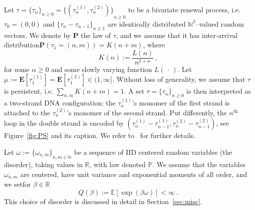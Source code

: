 \documentclass[11pt]{article}
\theoremstyle{definition}
\numberwithin{equation}{section}
\numberwithin{figure}{section}
\numberwithin{table}{section}
\DeclareMathOperator{\tHt}{th}
\newcommand{\ga}{\alpha}
\newcommand{\bP}{\ensuremath{\mathbf{P}}}
\newcommand{\bE}{\ensuremath{\mathbf{E}}}
\newcommand{\bbE}{\ensuremath{\mathbb{E}}}
\newcommand{\bbN}{\ensuremath{\mathbb{N}}}
\newcommand{\bbP}{\ensuremath{\mathbb{P}}}
\newcommand{\bbR}{\ensuremath{\mathbb{R}}}
\begin{document}
Let $\tau = {\lbrace \tau_n \rbrace}_{n\geq 0}= {\lbrace (\tau_n^{(1)}, \tau_n^{(2)}) \rbrace}_{n\geq 0}$ to be a bivariate renewal process, i.e. $\tau_0 = (0,0)$ and $\{ \tau_{n} - \tau_{n-1}\}_{n \geq 1}$ are identically distributed $\mathbb{N}^2$--valued random vectors. We denote by $\bP$ the law of $\tau$, and we assume that it has inter-arrival distribution\linebreak $\bP(\tau_1= (n,m))= K(n+m)$, where
\begin{equation}\label{def:Kn}
K(n) := \frac{L(n)}{n^{2+\ga}}\,,
\end{equation}
for some $\ga \ge 0$ and some slowly varying function $L({\,\cdot\,})$. Let $\mu := \bE [\tau_1^{(1)}]= \bE [\tau_1^{(2)}]\in (1, \infty]$. Without loss of generality, we assume that $\tau$ is persistent, i.e. $\sum_{n,m} K(n+m) =1$. A set $\tau={\lbrace \tau_n \rbrace}_{n\geq 0}$ is then interpreted as a two-strand DNA configuration: the $\tau_n^{(1)}$'s monomer of the first strand is attached to the $\tau_n^{(2)}$'s monomer of the second strand. Put differently, the $n^{\tHt}$ loop in the double strand is encoded by $(\tau_n^{(1)}-\tau_{n-1}^{(1)},\tau_n^{(2)}-\tau_{n-1}^{(2)})$, see Figure~\ref{fig:PS} and its caption. We refer to~\cite{cf:GK} for further details.

Let $ \omega := { \lbrace \omega_{n,m} \rbrace }_{n,m \in \bbN}$ be a sequence of IID centered random variables (the disorder), taking values in $\bbR$, with law denoted $\bbP$. We assume that the variables $\omega_{n,m}$ are centered, have unit variance and exponential moments of all order, and we set\linebreak for $\beta \in \bbR$
\begin{equation}\label{eq:defQ}
Q(\beta) := \bbE [\exp(\beta \omega)] < \infty\,.
\end{equation}
This choice of disorder is discussed in detail in Section~\ref{sec:misc}.
\end{document}
